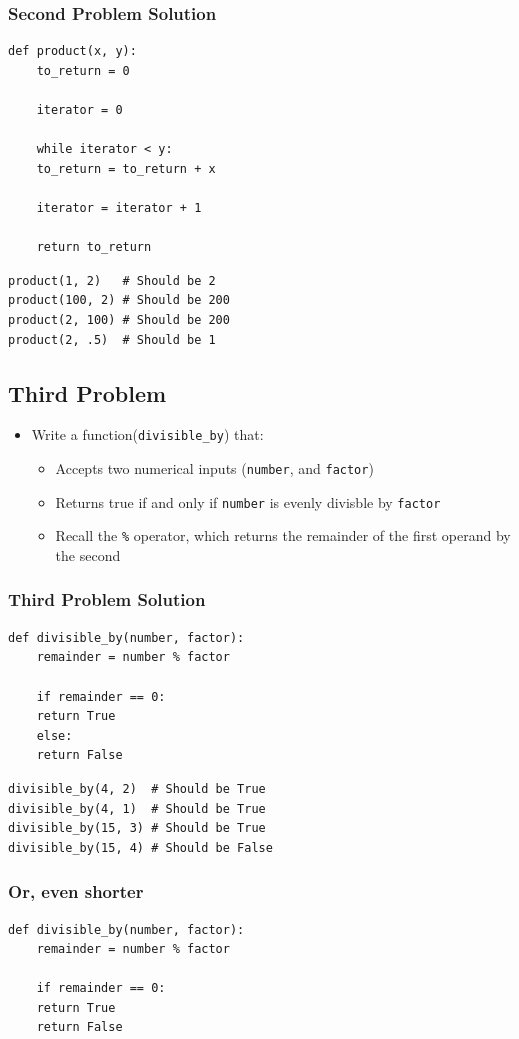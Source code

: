 \documentclass[11pt]{article}
\begin{document}
\subsubsection{Second Problem Solution}
\label{sec:orge0838a2}
\begin{verbatim}
def product(x, y):
    to_return = 0

    iterator = 0

    while iterator < y:
	to_return = to_return + x

	iterator = iterator + 1

    return to_return
\end{verbatim}
\begin{verbatim}
product(1, 2)   # Should be 2
product(100, 2) # Should be 200
product(2, 100) # Should be 200
product(2, .5)  # Should be 1
\end{verbatim}
\subsection{Third Problem}
\label{sec:org975ca3c}
\begin{itemize}
\item Write a function(\texttt{divisible\_by}) that:
\begin{itemize}
\item Accepts two numerical inputs (\texttt{number}, and \texttt{factor})
\item Returns true if and only if \texttt{number} is evenly divisble by \texttt{factor}
\item Recall the \texttt{\%} operator, which returns the remainder of the first operand by the second
\end{itemize}
\end{itemize}
\subsubsection{Third Problem Solution}
\label{sec:org27974a7}
\begin{verbatim}
def divisible_by(number, factor):
    remainder = number % factor

    if remainder == 0:
	return True
    else:
	return False
\end{verbatim}
\begin{verbatim}
divisible_by(4, 2)  # Should be True
divisible_by(4, 1)  # Should be True
divisible_by(15, 3) # Should be True
divisible_by(15, 4) # Should be False
\end{verbatim}

\subsubsection{Or, even shorter}
\label{sec:org30ab6ae}
\begin{verbatim}
def divisible_by(number, factor):
    remainder = number % factor

    if remainder == 0:
	return True
    return False
\end{verbatim}
\end{document}
